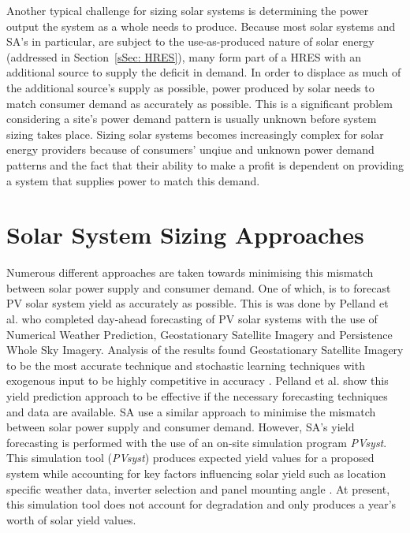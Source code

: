 \documentclass[a4paper,11pt,fleqn]{report}
\begin{document}
Another typical challenge for sizing solar systems is determining the power output the system as a whole needs to produce. Because most solar systems and \ac{SA}'s in particular, are subject to the use-as-produced nature of solar energy (addressed in Section~\ref{sSec: HRES}), many form part of a \ac{HRES} with an additional source to supply the deficit in demand. In order to displace as much of the additional source's supply as possible, power produced by solar needs to match consumer demand as accurately as possible. This is a significant problem considering a site's power demand pattern is usually unknown before system sizing takes place. Sizing solar systems becomes increasingly complex for solar energy providers because of consumers' unqiue and unknown power demand patterns and the fact that their ability to make a profit is dependent on providing a system that supplies power to match this demand. 

\section{Solar System Sizing Approaches} \label{sec: Sizing Approaches}
Numerous different approaches are taken towards minimising this mismatch between solar power supply and consumer demand. One of which, is to forecast \ac{PV} solar system yield as accurately as possible. This is was done by Pelland et al. \citep{Pelland2013} who completed day-ahead forecasting of \ac{PV} solar systems with the use of Numerical Weather Prediction, Geostationary Satellite Imagery and Persistence Whole Sky Imagery. Analysis of the results found Geostationary Satellite Imagery to be the most accurate technique and stochastic learning techniques with exogenous input to be highly competitive in accuracy \citep{Pelland2013}. Pelland et al. \citep{Pelland2013} show this yield prediction approach to be effective if the necessary forecasting techniques and data are available. \ac{SA} use a similar approach to minimise the mismatch between solar power supply and consumer demand. However, \ac{SA}'s yield forecasting is performed with the use of an on-site simulation program \textit{PVsyst}. This simulation tool (\textit{PVsyst}) produces expected yield values for a proposed system while accounting for key factors influencing solar yield such as location specific weather data, inverter selection and panel mounting angle \citep{PVsyst2012}. At present, this simulation tool does not account for degradation and only produces a year's worth of solar yield values.
\end{document}

